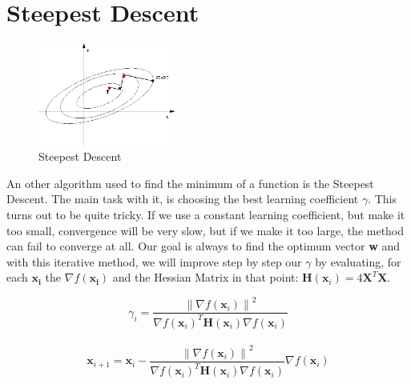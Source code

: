 \documentclass[12pt]{report}
\begin{document}
\section{Steepest Descent}
\begin{figure}
  \vspace{-10pt}
  \begin{center}
    \includegraphics[width=0.4\textwidth]{std.png}
    \caption{Steepest Descent}
    \label{fig:std}
  \end{center}
\end{figure}
An other algorithm used to find the minimum of a function is the Steepest Descent. The main task with it, is choosing the best learning coefficient $\gamma$. This turns out to be quite tricky. If we use a constant learning coefficient, but make it too small, convergence will be very slow, but if we make it too large, the method can fail to converge at all.
Our goal is always to find the optimum vector \textbf{w} and with this iterative method, we will improve step by step our $\gamma$ by evaluating, for each $\mathbf{x_i}$ the $\nabla f ( \mathbf { x_i } ) $ and the Hessian Matrix in that point: $\mathbf { H } \left( \mathbf { x } _ { i } \right) = 4 \mathbf { X } ^ { T } \mathbf { X }$.

\begin{flushright}
\begin{equation}
\gamma _ { i } = \frac { \left\| \nabla f \left( \mathbf { x } _ { i } \right) \right\| ^ { 2 } } { \nabla f \left( \mathbf { x } _ { i } \right) ^ { T } \mathbf { H } \left( \mathbf { x } _ { i } \right) \nabla f \left( \mathbf { x } _ { i } \right) }
\end{equation}\\


\begin{equation}
\mathbf { x } _ { i + 1 } = \mathbf { x } _ { i } - \frac { \left\| \nabla f \left( \mathbf { x } _ { i } \right) \right\| ^ { 2 } } { \nabla f \left( \mathbf { x } _ { i } \right) ^ { T } \mathbf { H } \left( \mathbf { x } _ { i } \right) \nabla f \left( \mathbf { x } _ { i } \right) } \nabla f \left( \mathbf { x } _ { i } \right)
\end{equation}
\end{flushright}
\end{document}
